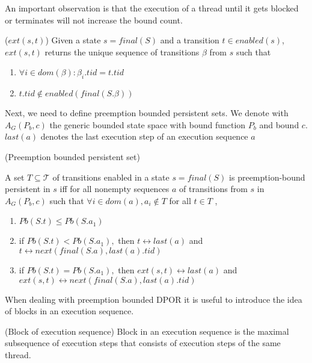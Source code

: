 An important observation is that the execution of a thread until it gets blocked or terminates will not increase
the bound count.
\begin{definition}{($ext(s,t)$)}
    Given a state $s = final(S)$ and a transition $t \in enabled(s)$,
    $ext(s,t)$ returns the unique sequence of transitions $\beta$ from $s$
    such that
    \begin{enumerate}
        \item $\forall i \in dom(\beta): \beta_i.tid = t.tid$
        \item $t.tid \notin enabled(final(S.\beta))$
    \end{enumerate}
\end{definition}

Next, we need to define preemption bounded persistent sets. We denote with $A_G(P_b,c)$ the generic 
bounded state space with bound function $P_b$ and bound $c$. $last(a)$ denotes the last execution step of
an execution sequence $a$

\begin{definition}{(Preemption bounded persistent set)}

A set $T \subseteq \mathcal{T}$ of transitions enabled in a state $s=final(S)$
is preemption-bound persistent in $s$ iff for all nonempty
sequences $a$ of transitions from $s$ in $A_G(P_b,c)$ such that
$\forall i \in dom(a), a_i \notin T$ for all $t \in T$ ,

\begin{enumerate}
\item $Pb(S.t) \leq Pb(S.a_1)$
\item if $Pb(S.t)<Pb(S.a_{1}) ,$ then $t \leftrightarrow last(a)$ and $t \leftrightarrow  next(final(S.a), last(a).tid)$
\item if $Pb(S.t)=Pb(S.a_{1}),$ then $ext(s,t) \leftrightarrow last(a)$ and $ext(s,t) \leftrightarrow next(final(S.a), last(a).tid)$
\end{enumerate}

\end{definition}

When dealing with preemption bounded DPOR it is useful to introduce the idea of blocks in an execution sequence.

\begin{definition}{(Block of execution sequence)}
    Block in an execution sequence is the maximal subsequence of execution steps that consists of execution steps of the same thread.
\end{definition}

